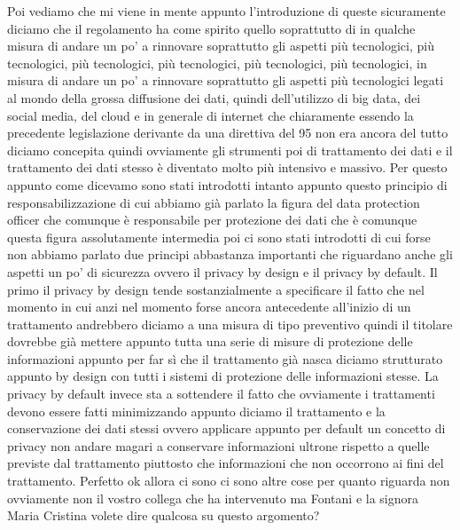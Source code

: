 Poi vediamo che mi viene in mente appunto l'introduzione di queste sicuramente diciamo che il regolamento ha come spirito quello soprattutto di in qualche misura di andare un po' a rinnovare soprattutto gli aspetti più tecnologici, più tecnologici, più tecnologici, più tecnologici, più tecnologici, più tecnologici, in misura di andare un po' a rinnovare soprattutto gli aspetti più tecnologici legati al mondo della grossa diffusione dei dati, quindi dell'utilizzo di big data, dei social media, del cloud e in generale di internet che chiaramente essendo la precedente legislazione derivante da una direttiva del 95 non era ancora del tutto diciamo concepita quindi ovviamente gli strumenti poi di trattamento dei dati e il trattamento dei dati stesso è diventato molto più intensivo e massivo.
Per questo appunto come dicevamo sono stati introdotti intanto appunto questo principio di responsabilizzazione di cui abbiamo già parlato la figura del data protection officer che comunque è responsabile per protezione dei dati che è comunque questa figura assolutamente intermedia poi ci sono stati introdotti di cui forse non abbiamo parlato due principi abbastanza importanti che riguardano anche gli aspetti un po' di sicurezza ovvero il privacy by design e il privacy by default.
Il primo il privacy by design tende sostanzialmente a specificare il fatto che nel momento in cui anzi nel momento forse ancora antecedente all'inizio di un trattamento andrebbero diciamo a una misura di tipo preventivo quindi il titolare dovrebbe già mettere appunto tutta una serie di misure di protezione delle informazioni appunto per far sì che il trattamento già nasca diciamo strutturato appunto by design con tutti i sistemi di protezione delle informazioni stesse.
La privacy by default invece sta a sottendere il fatto che ovviamente i trattamenti devono essere fatti minimizzando appunto diciamo il trattamento e la conservazione dei dati stessi ovvero applicare appunto per default un concetto di privacy non andare magari a conservare informazioni ultrone rispetto a quelle previste dal trattamento piuttosto che informazioni che non occorrono ai fini del trattamento.
Perfetto ok allora ci sono ci sono altre cose per quanto riguarda non ovviamente non il vostro collega che ha intervenuto ma Fontani e la signora Maria Cristina volete dire qualcosa su questo argomento?
